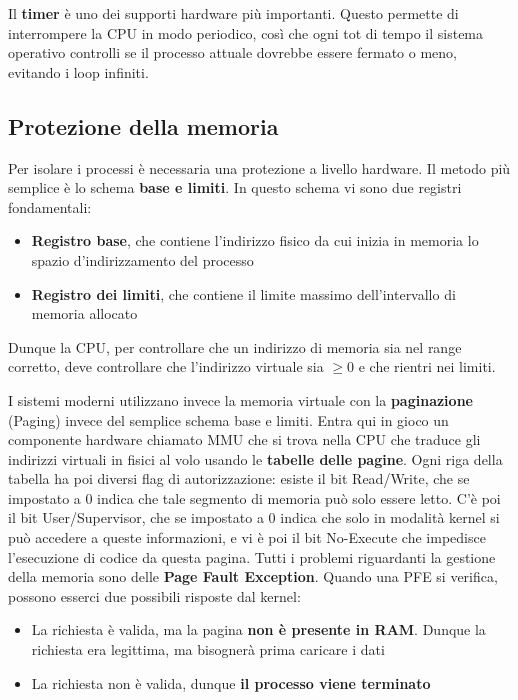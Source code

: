 \documentclass[11pt, a4paper, titlepage, oneside]{scrbook}
\begin{document}
\begin{Definizione}[Timer]
\label{def-timer}
Il \textbf{timer} è uno dei supporti hardware più importanti. Questo permette di interrompere la CPU in modo periodico, così che ogni tot di tempo il sistema operativo controlli se il processo attuale dovrebbe essere fermato o meno, evitando i loop infiniti.
\end{Definizione}

\subsection{Protezione della memoria}

Per isolare i processi è necessaria una protezione a livello hardware. Il metodo più semplice è lo schema \textbf{base e limiti}. In questo schema vi sono due registri fondamentali:
\begin{itemize}
    \item \textbf{Registro base}, che contiene l'indirizzo fisico da cui inizia in memoria lo spazio d'indirizzamento del processo
    \item \textbf{Registro dei limiti}, che contiene il limite massimo dell'intervallo di memoria allocato
\end{itemize}
Dunque la CPU, per controllare che un indirizzo di memoria sia nel range corretto, deve controllare che l'indirizzo virtuale sia $\geq 0$ e che rientri nei limiti. 

I sistemi moderni utilizzano invece la memoria virtuale con la \textbf{paginazione} (Paging) invece del semplice schema base e limiti. Entra qui in gioco un componente hardware chiamato MMU che si trova nella CPU che traduce gli indirizzi virtuali in fisici al volo usando le \textbf{tabelle delle pagine}. Ogni riga della tabella ha poi diversi flag di autorizzazione: esiste il bit Read/Write, che se impostato a 0 indica che tale segmento di memoria può solo essere letto. C'è poi il bit User/Supervisor, che se impostato a 0 indica che solo in modalità kernel si può accedere a queste informazioni, e vi è poi il bit No-Execute che impedisce l'esecuzione di codice da questa pagina. Tutti i problemi riguardanti la gestione della memoria sono delle \textbf{Page Fault Exception}. Quando una PFE si verifica, possono esserci due possibili risposte dal kernel:
\begin{itemize}
    \item La richiesta è valida, ma la pagina \textbf{non è presente in RAM}. Dunque la richiesta era legittima, ma bisognerà prima caricare i dati
    \item La richiesta non è valida, dunque \textbf{il processo viene terminato}
\end{itemize}
\end{document}
